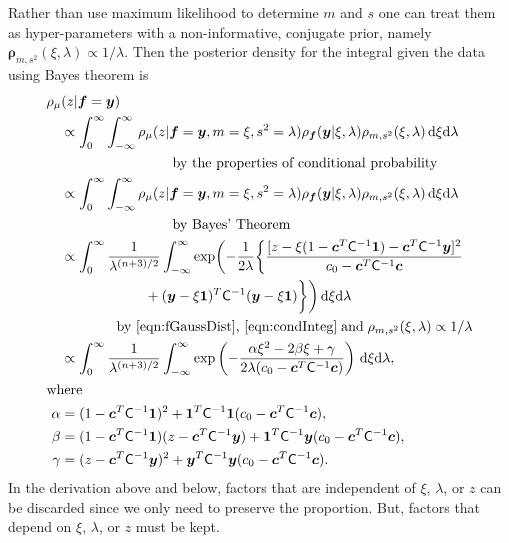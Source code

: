 \documentclass{iitthesis}          %
\newcommand{\bm}[1]{\boldsymbol{#1}}
\newcommand{\D}[1]{\text{d}{#1}}
\newcommand{\vc}{\bm{c}}
\newcommand{\vf}{\bm{f}}
\newcommand{\vrho}{\bm{\rho}}
\newcommand{\vy}{\bm{y}}
\newcommand{\vone}{\bm{1}}
\newcommand{\mC}{\mathsf{C}}
\begin{document}
Rather than use maximum likelihood to determine $m$ and $s$ one can treat them as hyper-parameters with a non-informative, conjugate prior, namely $\vrho_{m,s^2}(\xi, \lambda) \propto 1/\lambda$. Then the posterior density for the integral given the data using Bayes theorem is
\begin{align*}
\MoveEqLeft[1]{\rho_{\mu}(z | \vf = \vy)} \\
& \propto \int_{0}^\infty \int_{-\infty}^\infty \rho_{\mu}(z | \vf = \vy, m = \xi, s^2 = \lambda)  \rho_{\vf}(\vy | \xi, \lambda ) \rho_{m, s^2}(\xi, \lambda) \, \D \xi \D \lambda \\
&\qquad \qquad \qquad \qquad \text{by the properties of conditional probability} \\
& \propto \int_{0}^\infty \int_{-\infty}^\infty \rho_{\mu}(z | \vf = \vy, m = \xi, s^2 = \lambda)  \rho_{\vf}(\vy | \xi, \lambda ) \rho_{m, s^2}(\xi, \lambda) \, \D \xi \D \lambda \\
&\qquad \qquad \qquad \qquad \text{by Bayes' Theorem} \\
& \propto \displaystyle \int_{0}^\infty  \frac{1}{\lambda^{(n+3)/2}} 
 \int_{-\infty}^\infty  \exp \biggl( -\frac{1}{2\lambda}\biggl\{
\frac{
[z - \xi (1 - \vc^T \mC^{-1} \vone)  -  \vc^T \mC^{-1} \vy]^2}
{c_0  -\vc ^T \mC^{-1} \vc}  \\
& \qquad \qquad \qquad  + (\vy - \xi \vone)^T \mC^{-1}(\vy - \xi \vone) \biggr \} \biggr) \, \D \xi \D \lambda \\
&\qquad \qquad
\text{by \eqref{eqn:fGaussDist}, \eqref{eqn:condInteg}} \; \text{and} \; \rho_{m,s^2}(\xi,\lambda) \propto 1/\lambda \\
& \propto \displaystyle \int_{0}^\infty  \frac{1}{\lambda^{(n+3)/2}} \int_{-\infty}^\infty  \exp\left( -\frac{\alpha \xi^2 -2 \beta \xi + \gamma}{2\lambda(c_0  -\vc ^T \mC^{-1} \vc)} \right) \, \D \xi \D \lambda, \\
\intertext{where}
\alpha & = (1 - \vc^T \mC^{-1} \vone)^2 + \vone^T \mC^{-1} \vone (c_0  -\vc ^T \mC^{-1} \vc),\\
\beta & =(1 - \vc^T \mC^{-1} \vone)(z - \vc^T \mC^{-1} \vy )
  + \vone^T \mC^{-1} \vy (c_0  -\vc ^T \mC^{-1} \vc),\\
\gamma &  = (z - \vc^T \mC^{-1} \vy )^2  + \vy^T \mC^{-1} \vy (c_0  -\vc ^T \mC^{-1} \vc).
\end{align*}
In the derivation above and below, factors that are independent of $\xi$, $\lambda$, or $z$ can be discarded since we only need to preserve the proportion.  But, factors that depend on $\xi$, $\lambda$, or $z$ must be kept.  
\end{document}
